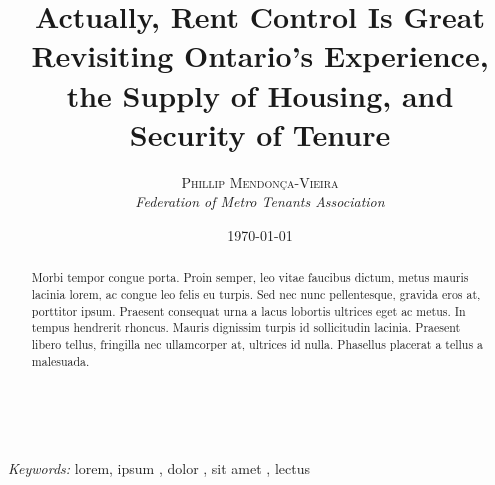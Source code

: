 \documentclass[letterpaper,12pt]{article} %
\title{\textsf{\textbf{Actually, Rent Control Is Great}\\ %
Revisiting Ontario's Experience, the Supply of Housing, and Security of Tenure}} %
\author{\textsc{Phillip Mendonça-Vieira} %
\\{\textit{Federation of Metro Tenants Association}}} %
\date{\today} %
\makeatletter
\renewcommand{\maketitle}{ %
\begin{flushright} %
{\LARGE\@title} %

\vspace{50pt} %

{\large\@author} %
\\\@date %

\vspace{40pt} %
\end{flushright}
}
\makeatother
\begin{document}
\maketitle %


\renewcommand{\abstractname}{\sffamily{Abstract}} %

\begin{abstract}
Morbi tempor congue porta. Proin semper, leo vitae faucibus dictum, metus mauris lacinia lorem, ac congue leo felis eu turpis. Sed nec nunc pellentesque, gravida eros at, porttitor ipsum. Praesent consequat urna a lacus lobortis ultrices eget ac metus. In tempus hendrerit rhoncus. Mauris dignissim turpis id sollicitudin lacinia. Praesent libero tellus, fringilla nec ullamcorper at, ultrices id nulla. Phasellus placerat a tellus a malesuada.
\end{abstract}

\hspace*{3,6mm}\textit{Keywords:} lorem, ipsum , dolor , sit amet , lectus %

\vspace{30pt} %


{\sffamily\tableofcontents}
\setcounter{secnumdepth}{-2}

\let\oldnumberline\numberline%
\renewcommand{\numberline}[1]{\hspace*{-1.5em}}%
\listoffigures
\let\numberline\oldnumberline%





\end{document}
